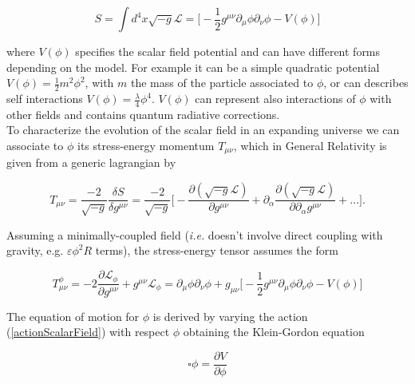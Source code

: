 \documentclass[11pt,a4paper,twoside]{book}
\begin{document}
\begin{equation}
	\label{actionScalarField}
	S=\int d^{4} x \sqrt{-g} \mathcal{L} = \Big [-\dfrac{1}{2} g^{\mu\nu} \partial_{\mu}\phi \partial_{\nu} \phi - V(\phi)\Big]	
\end{equation}

where $ V(\phi) $ specifies the scalar field potential and  can have different forms depending on the model. For example it can be a simple quadratic potential $ V(\phi)=\frac{1}{2}m^{2}\phi^{2} $, with $ m $ the mass of the particle associated to $ \phi $,$  $ or can describes  self interactions $ V(\phi) = \frac{\lambda}{4} \phi^{4} $. $ V(\phi) $ can represent also interactions of $ \phi $ with other fields and contains quantum radiative corrections. \\

To characterize the evolution of the scalar field in an expanding universe we can associate to $ \phi $ its stress-energy momentum $ T_{\mu\nu} $, which in General Relativity is given from a generic lagrangian by

\begin{equation}
	\label{stressEnergyMomentum}
	T_{\mu\nu}= \frac{-2}{\sqrt{-g}}\frac{\delta S}{\delta g^{\mu\nu}}=
	\frac{-2}{\sqrt{-g}}\Big [-\frac{\partial (\sqrt{-g} \mathcal{L})}{\partial g^{\mu\nu}} + \partial _{\alpha} \frac{\partial (\sqrt{-g} \mathcal{L})}{\partial \partial_{\alpha} g^{\mu\nu}} + ... \Big ].
\end{equation}

Assuming a minimally-coupled field (\textit{i.e.} doesn't involve direct coupling with gravity, e.g. $ \varepsilon  \phi^{2} R$ terms), the stress-energy tensor assumes the form

\begin{equation}
	\label{tensorScalrField2}
	T^{\phi}_{\mu\nu} = -2 \frac{\partial \mathcal{L}_{\phi}}{\partial g^{\mu\nu}} + g^{\mu\nu} \mathcal{L}_{\phi}
 =\partial_{\mu} \phi \partial_{\nu} \phi + g_{\mu\nu} \Big [-\frac{1}{2}g^{\mu\nu}\partial_{\mu}\phi\partial_{\nu}\phi - V(\phi)\Big]
\end{equation}

The equation of motion for $ \phi $ is derived by varying the action (\ref{actionScalarField}) with respect $ \phi $ obtaining the Klein-Gordon equation

\begin{equation}
	\label{KGEquation}
	\square  \phi = \frac{\partial V}{\partial \phi}	
\end{equation}
\end{document}
